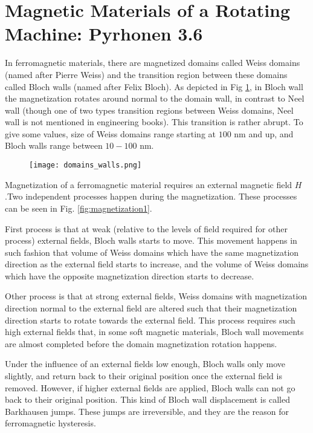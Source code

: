 \section{Magnetic Materials of a Rotating Machine: Pyrhonen 3.6}


In ferromagnetic materials, there are magnetized domains called Weiss domains (named after Pierre Weiss) and the transition region between these domains called Bloch walls (named after Felix Bloch). As depicted in Fig \ref{fig:domainsandwalls}, in Bloch wall the magnetization rotates around normal to the domain wall, in contrast to Neel wall (though one of two types transition regions between Weiss domains, Neel wall is not mentioned in engineering books). This transition is rather abrupt. To give some values, size of Weiss domains range starting at $100$ nm and up, and Bloch walls range between $10-100$ nm.

\begin{figure}[h]
    \centering
    \texttt{[image: domains\_walls.png]}
    \label{fig:domainsandwalls}
\end{figure}

Magnetization of a ferromagnetic material requires an  external magnetic field $H$.Two independent processes happen during the magnetization. These processes can be seen in Fig. \ref{fig:magnetization1}. 

First process is that at weak (relative to the levels of field required for other process) external fields, Bloch walls starts to move. This movement happens in such fashion that volume of Weiss domains which have the same magnetization direction as the external field starts to increase, and the volume of Weiss domains which have the opposite magnetization direction starts to decrease.

Other process is that at strong external fields, Weiss domains with magnetization direction normal to the external field are altered such that their magnetization direction starts to rotate towards the external field. This process requires such high external fields that, in some soft magnetic materials, Bloch wall movements are almost completed before the domain magnetization rotation happens.

Under the influence of an external fields low enough, Bloch walls only move slightly, and return back to their original position once the external field is removed. However, if higher external fields are applied, Bloch walls can not go back to their original position. This kind of Bloch wall displacement is called Barkhausen jumps. These jumps are irreversible, and they are the reason for ferromagnetic hysteresis.

